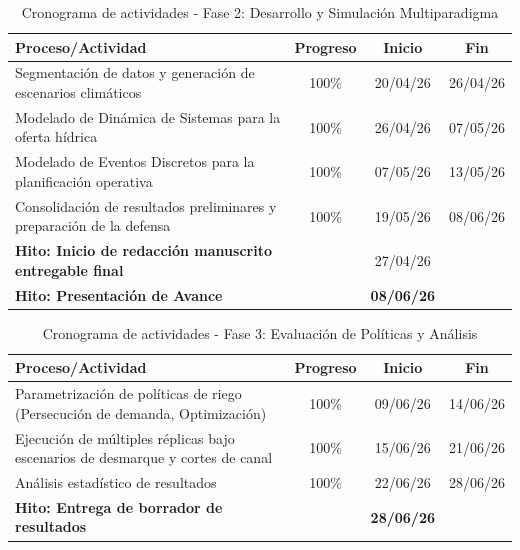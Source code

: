 \documentclass[12pt]{report}
\begin{document}
\begin{table}[h]
\centering
\begin{tabularx}{\textwidth}{|X|c|c|c|}
\hline
\textbf{Proceso/Actividad} & \textbf{Progreso} & \textbf{Inicio} & \textbf{Fin} \\
\hline
Segmentación de datos y generación de escenarios climáticos & 100\% & 20/04/26 & 26/04/26 \\
\hline
Modelado de Dinámica de Sistemas para la oferta hídrica & 100\% & 26/04/26 & 07/05/26 \\
\hline
Modelado de Eventos Discretos para la planificación operativa & 100\% & 07/05/26 & 13/05/26 \\
\hline
Consolidación de resultados preliminares y preparación de la defensa & 100\% & 19/05/26 & 08/06/26 \\
\hline
\textbf{Hito: Inicio de redacción manuscrito entregable final}  &  & 27/04/26 &  \\
\hline
\textbf{Hito: Presentación de Avance} & & \textbf{08/06/26} & \\
\hline
\end{tabularx}
\caption{Cronograma de actividades - Fase 2: Desarrollo y Simulación Multiparadigma}
\label{tab:fase2}
\end{table}

\begin{table}[h]
\centering
\begin{tabularx}{\textwidth}{|X|c|c|c|}
\hline
\textbf{Proceso/Actividad} & \textbf{Progreso} & \textbf{Inicio} & \textbf{Fin} \\
\hline
Parametrización de políticas de riego (Persecución de demanda, Optimización) & 100\% & 09/06/26 & 14/06/26 \\
\hline
Ejecución de múltiples réplicas bajo escenarios de desmarque y cortes de canal & 100\% & 15/06/26 & 21/06/26 \\
\hline
Análisis estadístico de resultados & 100\% & 22/06/26 & 28/06/26 \\
\hline
\textbf{Hito: Entrega de borrador de resultados} & & \textbf{28/06/26} & \\
\hline
\end{tabularx}
\caption{Cronograma de actividades - Fase 3: Evaluación de Políticas y Análisis}
\label{tab:fase3}
\end{table}
\end{document}
